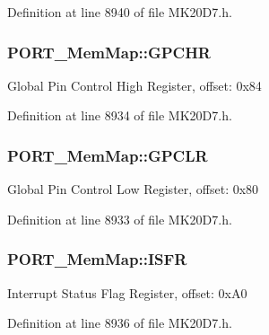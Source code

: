 Definition at line 8940 of file M\+K20\+D7.\+h.

\subsubsection[{\texorpdfstring{G\+P\+C\+HR}{GPCHR}}]{ P\+O\+R\+T\+\_\+\+Mem\+Map\+::\+G\+P\+C\+HR}\hypertarget{struct_p_o_r_t___mem_map_a84f8893cbefd6a3eff18b455f9069b29}{}\label{struct_p_o_r_t___mem_map_a84f8893cbefd6a3eff18b455f9069b29}
Global Pin Control High Register, offset\+: 0x84 

Definition at line 8934 of file M\+K20\+D7.\+h.

\subsubsection[{\texorpdfstring{G\+P\+C\+LR}{GPCLR}}]{ P\+O\+R\+T\+\_\+\+Mem\+Map\+::\+G\+P\+C\+LR}\hypertarget{struct_p_o_r_t___mem_map_a837c289643f8cec958b1f01c086b558a}{}\label{struct_p_o_r_t___mem_map_a837c289643f8cec958b1f01c086b558a}
Global Pin Control Low Register, offset\+: 0x80 

Definition at line 8933 of file M\+K20\+D7.\+h.

\subsubsection[{\texorpdfstring{I\+S\+FR}{ISFR}}]{ P\+O\+R\+T\+\_\+\+Mem\+Map\+::\+I\+S\+FR}\hypertarget{struct_p_o_r_t___mem_map_a53c86a08f430dc915a312efe74ba83e6}{}\label{struct_p_o_r_t___mem_map_a53c86a08f430dc915a312efe74ba83e6}
Interrupt Status Flag Register, offset\+: 0x\+A0 

Definition at line 8936 of file M\+K20\+D7.\+h.

